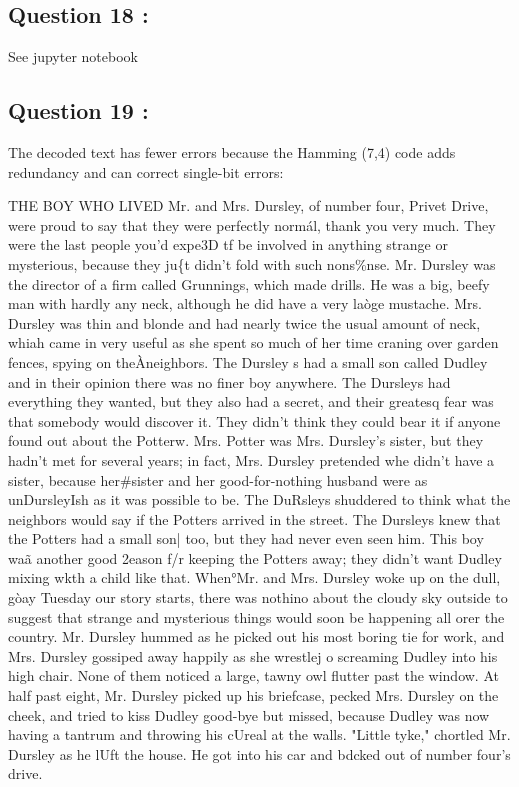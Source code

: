 \documentclass[titlepage]{article}
\begin{document}
\subsection{Question 18 : } 

See jupyter notebook 

\subsection{Question 19 : }

The decoded text has fewer errors because the Hamming (7,4) code adds redundancy and can correct single-bit errors:

\begin{displayquote}
    THE BOY WHO LIVED Mr. and Mrs. Dursley, of number four, Privet Drive, were proud to say that they were perfectly normál, thank you very much. They were the last people you'd expe3D tf be involved in anything strange or mysterious, because they ju\{t didn't fold with such nons\%nse. Mr. Dursley was the director of a firm called Grunnings, which made drills. He was a big, beefy man with hardly any neck, although he did have a very laòge mustache. Mrs. Dursley was thin and blonde and had nearly twice the usual amount of neck, whiah came in very useful as she spent so much of her time craning over garden fences, spying on theÀneighbors. The Dursley s had a small son called Dudley and in their opinion there was no finer boy anywhere. The Dursleys had everything they wanted, but they also had a secret, and their greatesq fear was that somebody would discover it. They didn't think they could bear it if anyone found out about the Potterw. Mrs. Potter was Mrs. Dursley's sister, but they hadn't met for several years; in fact, Mrs. Dursley pretended whe didn't have a sister, because her\#sister and her good-for-nothing husband were as unDursleyIsh as it was possible to be. The DuRsleys shuddered to think what the neighbors would say if the Potters arrived in the street. The Dursleys knew that the Potters had a small son| too, but they had never even seen him. This boy waã another good 2eason f/r keeping the Potters away; they didn't want Dudley mixing wkth a child like that. When°Mr. and Mrs. Dursley woke up on the dull, gòay Tuesday our story starts, there was nothino about the cloudy sky outside to suggest that strange and mysterious things would soon be happening all orer the country. Mr. Dursley hummed as he picked out his most boring tie for work, and Mrs. Dursley gossiped away happily as she wrestlej o screaming Dudley into his high chair. None of them noticed a large, tawny owl flutter past the window. At half past eight, Mr. Dursley picked up his briefcase, pecked Mrs. Dursley on the cheek, and tried to kiss Dudley good-bye but missed, because Dudley was now having a tantrum and throwing his cUreal at the walls. "Little tyke," chortled Mr. Dursley as he lUft the house. He got into his car and bdcked out of number four's drive.
\end{displayquote}
\end{document}
